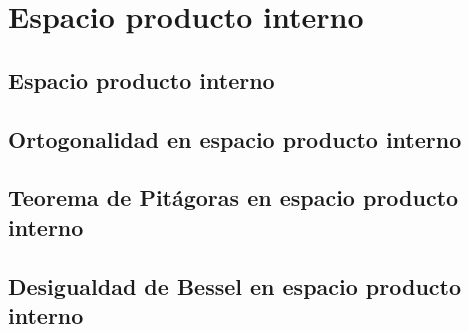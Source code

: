 \chapter{Espacio producto interno}

\section{Espacio producto interno}

\section{Ortogonalidad en espacio producto interno}

\section{Teorema de Pitágoras en espacio producto interno}

\section{Desigualdad de Bessel en espacio producto interno}